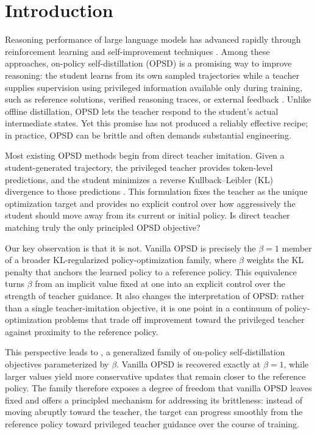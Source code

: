 
\vspace{-4mm}
\section{Introduction}

Reasoning performance of large language models has advanced rapidly through reinforcement
learning and self-improvement techniques
\citep{shao2024deepseekmath, ouyang2022training, guo2025deepseek}. Among these approaches,
on-policy self-distillation (OPSD) is a promising way to improve reasoning: the student learns
from its own sampled trajectories while a teacher supplies supervision using privileged
information available only during training, such as reference solutions, verified reasoning
traces, or external feedback
\citep{zhao2026self, shenfeld2026self, hubotter2026reinforcement, li2026rethinking,
jang2026stable, yang2026self}. Unlike offline distillation, OPSD lets the teacher respond to
the student's actual intermediate states. Yet this promise has not produced a reliably
effective recipe; in practice, OPSD can be brittle and often demands substantial engineering.

Most existing OPSD methods begin from direct teacher imitation. Given a student-generated
trajectory, the privileged teacher provides token-level predictions, and the student minimizes
a reverse Kullback--Leibler (KL) divergence to those predictions
\citep{zhao2026self, jang2026stable, li2026rethinking, yang2026self}. This formulation fixes
the teacher as the unique optimization target and provides no explicit control over how
aggressively the student should move away from its current or initial policy. Is direct teacher
matching truly the only principled OPSD objective?

Our key observation is that it is not. Vanilla OPSD is precisely the $\beta=1$ member of a
broader KL-regularized policy-optimization family, where $\beta$ weights the KL penalty that
anchors the learned policy to a reference policy. This equivalence turns $\beta$ from an
implicit value fixed at one into an explicit control over the strength of teacher guidance.
It also changes the interpretation of OPSD: rather than a single teacher-imitation objective,
it is one point in a continuum of policy-optimization problems that trade off improvement
toward the privileged teacher against proximity to the reference policy.

This perspective leads to \oursbold, a generalized family of on-policy self-distillation
objectives parameterized by $\beta$. Vanilla OPSD is recovered exactly at $\beta=1$, while
larger values yield more conservative updates that remain closer to the reference policy.
The family therefore exposes a degree of freedom that vanilla OPSD leaves fixed and offers
a principled mechanism for addressing its brittleness: instead of moving abruptly toward
the teacher, the target can progress smoothly from the reference policy toward privileged
teacher guidance over the course of training.

